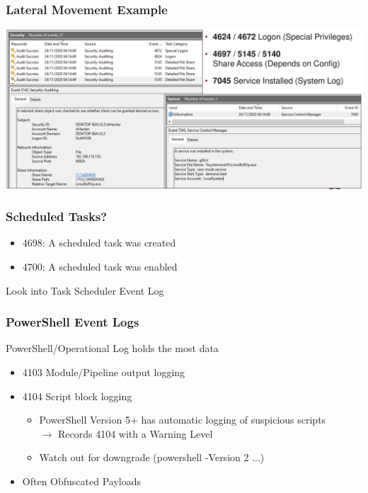 \subsubsection*{Lateral Movement Example}
\begin{center}
  \includegraphics[width=\textwidth]{resources/05-lateral-movement.png}
\end{center}

\subsubsection*{Scheduled Tasks?}
\begin{itemize}
   \item 4698: A scheduled task was created
   \item 4700: A scheduled task was enabled
\end{itemize}

Look into Task Scheduler Event Log

\subsubsection*{PowerShell Event Logs}
PowerShell/Operational Log holds the most data
\begin{itemize}
    \item 4103 Module/Pipeline output logging
    \item 4104 Script block logging
    \begin{itemize}
        \item PowerShell Version 5+ has automatic logging of suspicious scripts\\
        $\rightarrow$ Records 4104 with a Warning Level
        \item Watch out for downgrade (powershell -Version 2 ...)
    \end{itemize}
    \item Often Obfuscated Payloads
\end{itemize}

